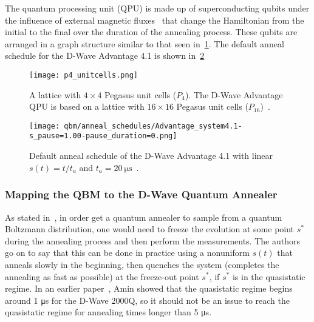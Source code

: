 The quantum processing unit (QPU) is made up of superconducting qubits under the influence of external magnetic fluxes~\cite{qc_lecture_notes} that change the Hamiltonian from the initial to the final over the duration of the annealing process.
These qubits are arranged in a graph structure similar to that seen in~\cref{fig:p4_unitcells}.
The default anneal schedule for the D-Wave Advantage 4.1 is shown in~\cref{fig:anneal_schedule_default}
\begin{figure}[!htb]
    \begin{center}
        \texttt{[image: p4\_unitcells.png]}
    \end{center}
    \caption{
        A lattice with \( 4 \times 4 \) Pegasus unit cells (\( P_4 \)).
        The D-Wave Advantage QPU is based on a lattice with \( 16 \times 16 \) Pegasus unit cells (\( P_{16} \))~\cite{dwave_topologies}.
    }
    \label{fig:p4_unitcells}
\end{figure}
\begin{figure}[!htb]
    \begin{center}
        \texttt{[image: qbm/anneal\_schedules/Advantage\_system4.1-s\_pause=1.00-pause\_duration=0.png]}
    \end{center}
    \caption{
        Default anneal schedule of the D-Wave Advantage 4.1 with linear \( s(t) = t / t_a \) and \( t_a = 20 \ \si{\micro\second} \)~\cite{dwave_anneal_schedules}.
    }
    \label{fig:anneal_schedule_default}
\end{figure}

\subsubsection{Mapping the QBM to the D-Wave Quantum Annealer}
As stated in~\cite{amin_2018}, in order get a quantum annealer to sample from a quantum Boltzmann distribution, one would need to freeze the evolution at some point \( s^* \) during the annealing process and then perform the measurements.
The authors go on to say that this can be done in practice using a nonuniform \( s(t) \) that anneals slowly in the beginning, then quenches the system (completes the annealing as fast as possible) at the freeze-out point \( s^* \), if \( s^* \) is in the quasistatic regime.
In an earlier paper~\cite{amin_2015}, Amin showed that the quasistatic regime begins around 1 \si{\micro\second} for the D-Wave 2000Q, so it should not be an issue to reach the quasistatic regime for annealing times longer than 5 \si{\micro\second}.

